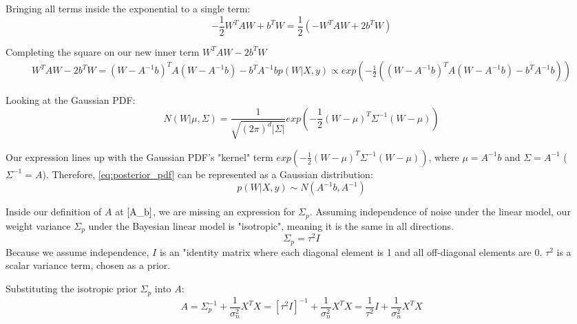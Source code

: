 Bringing all terms inside the exponential to a single term:
\begin{equation*}
    -\frac{1}{2}W^TAW + b^TW = \frac{1}{2}\left(-W^TAW + 2b^TW\right)
\end{equation*}

Completing the square on our new inner term $W^TAW - 2b^TW$ 
\begin{equation} \label{eq:posterior_pdf}
    \begin{aligned}
        W^TAW - 2b^TW = (W - A^{-1}b)^TA(W - A^{-1}b) - b^TA^{-1}b
        p(W|X,y) \propto exp\left(-\frac{1}{2}\left((W - A^{-1}b)^TA(W - A^{-1}b) - b^TA^{-1}b\right)\right)
    \end{aligned}
\end{equation}

Looking at the Gaussian PDF:
\begin{equation} \label{eq:gaussian_pdf}
    N(W | \mu, \Sigma) = \frac{1}{\sqrt{(2\pi)^d |\Sigma|}} exp\left(-\frac{1}{2}(W - \mu)^T\Sigma^{-1}(W - \mu)\right)
\end{equation}

Our expression lines up with the Gaussian PDF's "kernel" term $exp\left(-\frac{1}{2}(W - \mu)^T\Sigma^{-1}(W - \mu)\right)$, where $\mu = A^{-1}b$ and $\Sigma = A^{-1}$ ($\Sigma^{-1} = A$). Therefore, \ref{eq:posterior_pdf} can be represented as a Gaussian distribution:
\begin{equation} \label{eq:posterior_gaussian}
    p(W|X,y) \sim N(A^{-1}b, A^{-1})
\end{equation}

Inside our definition of $A$ at $\ref{A_b}$, we are missing an expression for $\Sigma_p$. Assuming independence of noise under the linear model, our weight variance $\Sigma_p$ under the Bayesian linear model is "isotropic", meaning it is the same in all directions.
\begin{equation*}
    \Sigma_p = \tau^2 I
\end{equation*}
Because we assume independence, $I$ is an "identity matrix where each diagonal element is 1 and all off-diagonal elements are 0. $\tau^2$ is a scalar variance term, chosen as a prior.

Substituting the isotropic prior $\Sigma_p$ into $A$:
\begin{equation*}
    A = \Sigma_p^{-1} + \frac{1}{\sigma^2_n}X^TX = \left[{\tau^2}I\right]^{-1} + \frac{1}{\sigma^2_n}X^TX =  \frac{1}{\tau^2}I + \frac{1}{\sigma^2_n}X^TX
\end{equation*}

